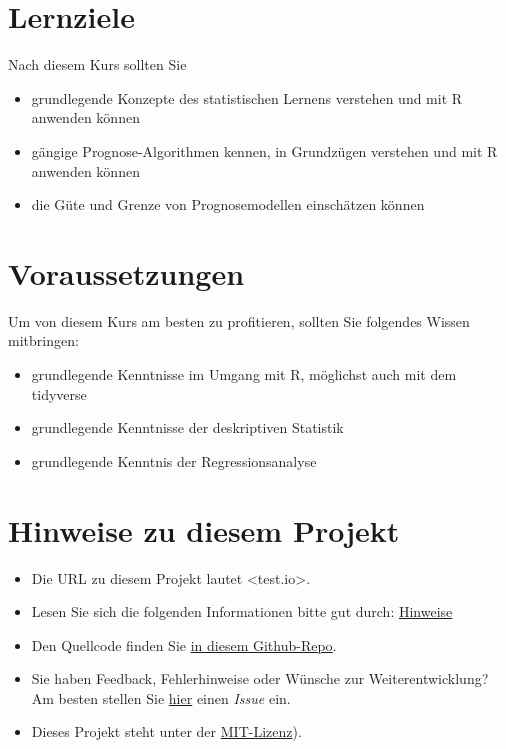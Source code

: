 \documentclass[
]{book}
\providecommand{\tightlist}{%
  \setlength{\itemsep}{0pt}\setlength{\parskip}{0pt}}
\begin{document}
\hypertarget{lernziele}{%
\section{Lernziele}\label{lernziele}}

Nach diesem Kurs sollten Sie

\begin{itemize}
\tightlist
\item
  grundlegende Konzepte des statistischen Lernens verstehen und mit R anwenden können
\item
  gängige Prognose-Algorithmen kennen, in Grundzügen verstehen und mit R anwenden können
\item
  die Güte und Grenze von Prognosemodellen einschätzen können
\end{itemize}

\hypertarget{voraussetzungen}{%
\section{Voraussetzungen}\label{voraussetzungen}}

Um von diesem Kurs am besten zu profitieren,
sollten Sie folgendes Wissen mitbringen:

\begin{itemize}
\tightlist
\item
  grundlegende Kenntnisse im Umgang mit R, möglichst auch mit dem tidyverse
\item
  grundlegende Kenntnisse der deskriptiven Statistik
\item
  grundlegende Kenntnis der Regressionsanalyse
\end{itemize}

\hypertarget{hinweise-zu-diesem-projekt}{%
\section{Hinweise zu diesem Projekt}\label{hinweise-zu-diesem-projekt}}

\begin{itemize}
\item
  Die URL zu diesem Projekt lautet \textless test.io\textgreater.
\item
  Lesen Sie sich die folgenden Informationen bitte gut durch: \href{https://sebastiansauer.github.io/fopra/Interna/Hinweise.html}{Hinweise}
\item
  Den Quellcode finden Sie \href{https://github.com/sebastiansauer/datascience1}{in diesem Github-Repo}.
\item
  Sie haben Feedback, Fehlerhinweise oder Wünsche zur Weiterentwicklung? Am besten stellen Sie \href{https://github.com/sebastiansauer/datascience1/issues}{hier} einen \emph{Issue} ein.
\item
  Dieses Projekt steht unter der \href{https://github.com/sebastiansauer/datascience1/blob/main/LICENSE}{MIT-Lizenz}).
\end{itemize}
\end{document}
